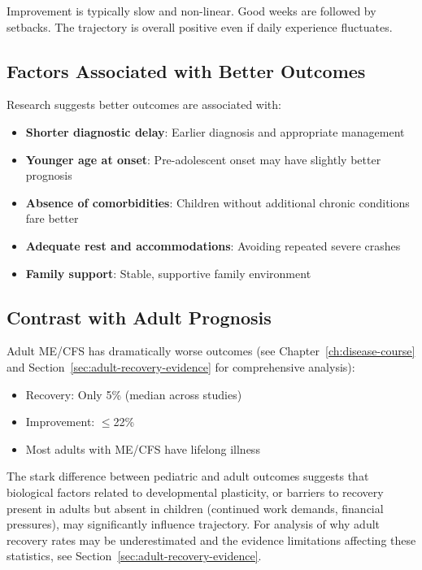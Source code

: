 Improvement is typically slow and non-linear. Good weeks are followed by setbacks. The trajectory is overall positive even if daily experience fluctuates.

\subsection{Factors Associated with Better Outcomes}

Research suggests better outcomes are associated with:
\begin{itemize}
    \item \textbf{Shorter diagnostic delay}: Earlier diagnosis and appropriate management
    \item \textbf{Younger age at onset}: Pre-adolescent onset may have slightly better prognosis
    \item \textbf{Absence of comorbidities}: Children without additional chronic conditions fare better
    \item \textbf{Adequate rest and accommodations}: Avoiding repeated severe crashes
    \item \textbf{Family support}: Stable, supportive family environment
\end{itemize}

\subsection{Contrast with Adult Prognosis}

Adult ME/CFS has dramatically worse outcomes (see Chapter~\ref{ch:disease-course} and Section~\ref{sec:adult-recovery-evidence} for comprehensive analysis):
\begin{itemize}
    \item Recovery: Only 5\% (median across studies)
    \item Improvement: $\leq$22\%
    \item Most adults with ME/CFS have lifelong illness
\end{itemize}

The stark difference between pediatric and adult outcomes suggests that biological factors related to developmental plasticity, or barriers to recovery present in adults but absent in children (continued work demands, financial pressures), may significantly influence trajectory. For analysis of why adult recovery rates may be underestimated and the evidence limitations affecting these statistics, see Section~\ref{sec:adult-recovery-evidence}.

